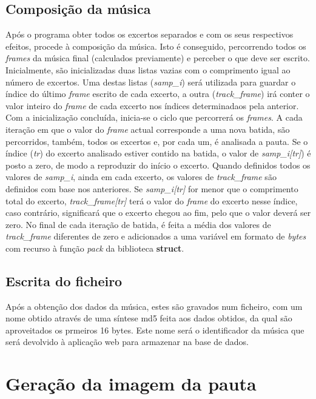 \documentclass{report}
\begin{document}
\section{Composição da música}
\label{sec.comp}

Após o programa obter todos os excertos separados e com os seus respectivos efeitos, procede à composição da música. Isto é conseguido, percorrendo todos os \textit{frames} da música final (calculados previamente) e perceber o que deve ser escrito.
Inicialmente, são inicializadas duas listas vazias com o comprimento igual ao número de excertos. Uma destas listas (\textit{samp\_i}) será utilizada para guardar o índice do último \textit{frame} escrito de cada excerto, a outra (\textit{track\_frame}) irá conter o valor inteiro do \textit{frame} de cada excerto nos índices determinadaos pela anterior. Com a inicialização concluída, inicia-se o ciclo que percorrerá os \textit{frames}. A cada iteração em que o valor do \textit{frame} actual corresponde a uma nova batida, são percorridos, também, todos os excertos e, por cada um, é analisada a pauta. Se o índice (\textit{tr}) do excerto analisado estiver contido na batida, o valor de \textit{samp\_i[tr]}) é posto a zero, de modo a reproduzir do início o excerto. Quando definidos todos os valores de \textit{samp\_i}, ainda em cada excerto, os valores de \textit{track\_frame} são definidos com base nos anteriores. Se \textit{samp\_i[tr]} for menor que o comprimento total do excerto, \textit{track\_frame[tr]} terá o valor do \textit{frame} do excerto nesse índice, caso contrário, significará que o excerto chegou ao fim, pelo que o valor deverá ser zero. No final de cada iteração de batida, é feita a média dos valores de \textit{track\_frame} diferentes de zero e adicionados a uma variável em formato de \textit{bytes} com recurso à função \textit{pack} da biblioteca \textbf{struct}.

\section{Escrita do ficheiro}
\label{sec.escrita}

Após a obtenção dos dados da música, estes são gravados num ficheiro, com um nome obtido através de uma síntese md5 feita aos dados obtidos, da qual são aproveitados os prmeiros 16 bytes. Este nome será o identificador da música que será devolvido à aplicação web para armazenar na base de dados.

\chapter{Geração da imagem da pauta}
\label{chap.imgpauta}
\end{document}
